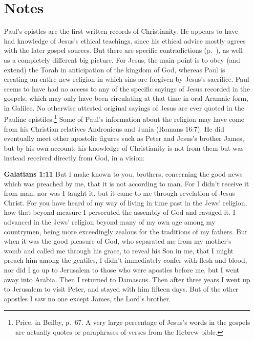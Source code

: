 \documentclass[10pt,twoside]{article} %
\newcommand{\quotesize}{\normalsize{}}
\newcommand{\maintextquotesize}{\renewcommand{\quotesize}{\large{}}}
\newcommand{\notequotesize}{\renewcommand{\quotesize}{\normalsize{}}}
\newenvironment{quotetext}{\begingroup\quotesize}{\endgroup}
\newcommand{\intex}[1]{\index[texts]{#1}}
\newcommand{\reftex}[1]{#1\intex{#1}}
\newcommand{\bible}[2]{\begin{quotetext}\textbf{#1}\intex{#1} #2\end{quotetext}}
\newenvironment{notesection}[1]{
  \setcounter{secnumdepth}{0}          %
  \section*{#1}
  \setcounter{secnumdepth}{2}          %
  \notequotesize
}%
{
  \maintextquotesize
}
\begin{document}
\begin{notesection}{Notes}
Paul's epistles are the first written records of Christianity. He appears to have had knowledge of
Jesus's ethical teachings, since his ethical advice mostly agrees with the later gospel sources.
But there are specific contradictions (p.~\pageref{paul-contradicts-gospels}), as well as a completely
different big picture. For Jesus, the main point is to obey (and extend) the Torah in anticipation of
the kingdom of God, whereas Paul is creating an entire new religion in which sins are
forgiven by Jesus's sacrifice. Paul seems to have had
no access to any of the specific sayings of Jesus recorded in the gospels, which may only have been
circulating at that time in oral Aramaic form, in Galilee. No otherwise attested original sayings of Jesus are ever quoted in the Pauline
epistiles.\footnote{Price, in Beilby, p.~67. A very large percentage of Jesus's words in the gospels are actually quotes or paraphrases of verses from the Hebrew bible.}
Some of Paul's information about the religion may have come from his Christian relatives Andronicus and Junia (\reftex{Romans 16:7}).
He did eventually meet other apostolic figures such as Peter and Jesus's brother James, but
by his own account, his knowledge of Christianity is not from them but was instead
received directly from God, in a vision:


\bible{Galatians 1:11}{
But I make known to you, brothers, concerning the good news which was preached by me, that it is not according to man.   For I didn't receive it from man, nor was I taught it, but it came to me through revelation of Jesus Christ.   For you have heard of my way of living in time past in the Jews' religion, how that beyond measure I persecuted the assembly of God and ravaged it.   I advanced in the Jews' religion beyond many of my own age among my countrymen, being more exceedingly zealous for the traditions of my fathers.   But when it was the good pleasure of God, who separated me from my mother's womb and called me through his grace,   to reveal his Son in me, that I might preach him among the gentiles, I didn't immediately confer with flesh and blood,   nor did I go up to Jerusalem to those who were apostles before me, but I went away into Arabia. Then I returned to Damascus.
  Then after three years I went up to Jerusalem to visit Peter, and stayed with him fifteen days.   But of the other apostles I saw no one except James, the Lord's brother. 
}


\end{notesection}
\end{document}
